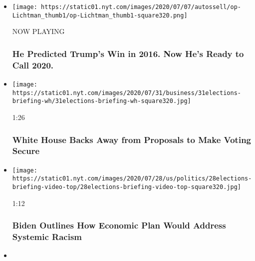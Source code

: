 \begin{itemize}
\item
  \texttt{[image: https://static01.nyt.com/images/2020/07/07/autossell/op-Lichtman\_thumb1/op-Lichtman\_thumb1-square320.png]}

  NOW PLAYING

  \hypertarget{he-predicted-trumps-win-in-2016-now-hes-ready-to-call-2020-2}{%
  \subsubsection{He Predicted Trump's Win in 2016. Now He's Ready to
  Call
  2020.}\label{he-predicted-trumps-win-in-2016-now-hes-ready-to-call-2020-2}}
\item
  \href{https://www.nytimes.com/video/us/100000007267362/white-house-mail-in-ballots-election.html?action=click\&module=video-series-bar\&region=header\&pgtype=Article\&playlistId=video/2020-Elections}{}

  \texttt{[image: https://static01.nyt.com/images/2020/07/31/business/31elections-briefing-wh/31elections-briefing-wh-square320.jpg]}

  1:26

  \hypertarget{white-house-backs-away-from-proposals-to-make-voting-secure}{%
  \subsubsection{White House Backs Away from Proposals to Make Voting
  Secure}\label{white-house-backs-away-from-proposals-to-make-voting-secure}}
\item
  \href{https://www.nytimes.com/video/us/politics/100000007260487/watch-live-biden-delivers-speech-on-systemic-racism.html?action=click\&module=video-series-bar\&region=header\&pgtype=Article\&playlistId=video/2020-Elections}{}

  \texttt{[image: https://static01.nyt.com/images/2020/07/28/us/politics/28elections-briefing-video-top/28elections-briefing-video-top-square320.jpg]}

  1:12

  \hypertarget{biden-outlines-how-economic-plan-would-address-systemic-racism}{%
  \subsubsection{Biden Outlines How Economic Plan Would Address Systemic
  Racism}\label{biden-outlines-how-economic-plan-would-address-systemic-racism}}
\item
  \href{https://www.nytimes.com/video/us/100000007251300/biden-trump-racist-divide-america.html?action=click\&module=video-series-bar\&region=header\&pgtype=Article\&playlistId=video/2020-Elections}{}


\end{itemize}
